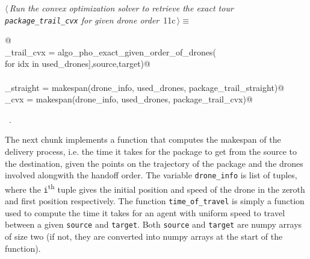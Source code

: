 \documentclass[10pt, english, oneside]{report}
\newcommand{\tss}{\textsuperscript}
\begin{document}
\begin{flushleft} \small
\begin{minipage}{\linewidth}\label{scrap10}\raggedright\small
{} $\langle\,${\itshape Run the convex optimization solver to retrieve the exact tour \verb|package_trail_cvx| for given drone order}\nobreak\ {\footnotesize {11c}}$\,\rangle\equiv$
\vspace{-1ex}
\begin{list}{}{} \item
\mbox{}\verb@   @\\
\mbox{}\verb@package_trail_cvx =  algo_pho_exact_given_order_of_drones(\@\\
\mbox{}\verb@                             [drone_info[idx] for idx in used_drones],source,target)@\\
\mbox{}\verb@@\\
\mbox{}\verb@mspan_straight    = makespan(drone_info, used_drones, package_trail_straight)@\\
\mbox{}\verb@mspan_cvx         = makespan(drone_info, used_drones, package_trail_cvx)@\\
\mbox{}\verb@@{\NWsep}
\end{list}
\vspace{-1.5ex}
\footnotesize
\begin{list}{}{\setlength{\itemsep}{-\parsep}\setlength{\itemindent}{-\leftmargin}}
\item \NWtxtMacroRefIn\ .

\item{}
\end{list}
\end{minipage}\vspace{4ex}
\end{flushleft}



The next chunk implements a function that computes the makespan of the delivery process, i.e. the time it takes
for the package to get from the source to the destination, given the points on the trajectory of the package
and the drones involved alongwith the handoff order. The variable \verb|drone_info| is list of 
tuples, where the \verb|i|\tss{th} tuple  gives the initial position and speed of the drone 
in the zeroth and first position respectively. The function \verb|time_of_travel| is simply a function
used to compute the time it takes for an agent with uniform speed to travel between a given \verb|source|
and \verb|target|. Both \verb|source| and \verb|target| are numpy arrays of size two (if not, they are converted into 
numpy arrays at the start of the function). 
\end{document}
